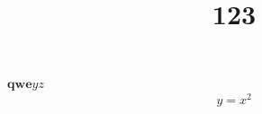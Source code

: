 \documentclass{mdocs}
\title{123}
\begin{document}
$\bm{qwe}yz$
\begin{align}
    y=x^2
\end{align}
\end{document}
